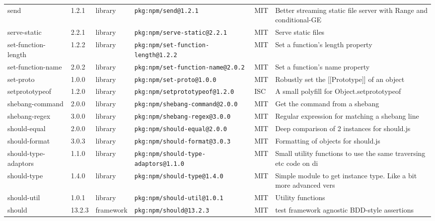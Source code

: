 \documentclass[11pt,a4paper]{article}
\begin{document}
\begin{longtable}{|p{4cm}|p{2cm}|p{1.6cm}|p{5cm}|p{1.5cm}|p{3.5cm}|}
\raggedright send & 1.2.1 & library & \small\texttt{pkg:npm/send@1.2.1} & MIT & \small Better streaming static file server with Range and conditional-GE \\
\raggedright serve-static & 2.2.1 & library & \small\texttt{pkg:npm/serve-static@2.2.1} & MIT & \small Serve static files \\
\raggedright set-function-length & 1.2.2 & library & \small\texttt{pkg:npm/set-function-length@1.2.2} & MIT & \small Set a function's length property \\
\raggedright set-function-name & 2.0.2 & library & \small\texttt{pkg:npm/set-function-name@2.0.2} & MIT & \small Set a function's name property \\
\raggedright set-proto & 1.0.0 & library & \small\texttt{pkg:npm/set-proto@1.0.0} & MIT & \small Robustly set the [[Prototype]] of an object \\
\raggedright setprototypeof & 1.2.0 & library & \small\texttt{pkg:npm/setprototypeof@1.2.0} & ISC & \small A small polyfill for Object.setprototypeof \\
\raggedright shebang-command & 2.0.0 & library & \small\texttt{pkg:npm/shebang-command@2.0.0} & MIT & \small Get the command from a shebang \\
\raggedright shebang-regex & 3.0.0 & library & \small\texttt{pkg:npm/shebang-regex@3.0.0} & MIT & \small Regular expression for matching a shebang line \\
\raggedright should-equal & 2.0.0 & library & \small\texttt{pkg:npm/should-equal@2.0.0} & MIT & \small Deep comparison of 2 instances for should.js \\
\raggedright should-format & 3.0.3 & library & \small\texttt{pkg:npm/should-format@3.0.3} & MIT & \small Formatting of objects for should.js \\
\raggedright should-type-adaptors & 1.1.0 & library & \small\texttt{pkg:npm/should-type-adaptors@1.1.0} & MIT & \small Small utility functions to use the same traversing etc code on di \\
\raggedright should-type & 1.4.0 & library & \small\texttt{pkg:npm/should-type@1.4.0} & MIT & \small Simple module to get instance type. Like a bit more advanced vers \\
\raggedright should-util & 1.0.1 & library & \small\texttt{pkg:npm/should-util@1.0.1} & MIT & \small Utility functions \\
\raggedright should & 13.2.3 & framework & \small\texttt{pkg:npm/should@13.2.3} & MIT & \small test framework agnostic BDD-style assertions \\

\end{longtable}
\end{document}
